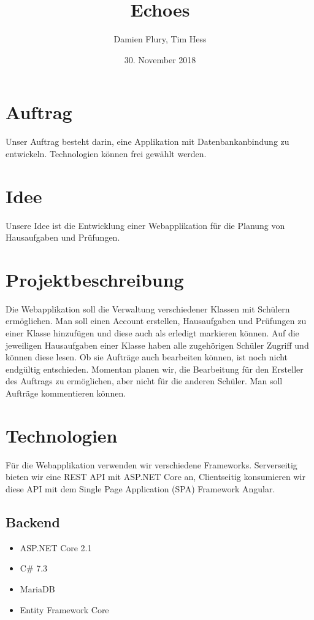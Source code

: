 \documentclass[a4paper, titlepage]{article}
\title{Echoes}
\author{Damien Flury, Tim Hess}
\date{30. November 2018}
\begin{document}
    \maketitle
    \tableofcontents
    \newpage
    
    \section{Auftrag}
    Unser Auftrag besteht darin, eine Applikation mit Datenbankanbindung zu entwickeln. Technologien
    können frei gewählt werden.
    \section{Idee}
    Unsere Idee ist die Entwicklung einer Webapplikation für die Planung von Hausaufgaben
    und Prüfungen. 
    \section{Projektbeschreibung}
    Die Webapplikation soll die Verwaltung verschiedener Klassen mit Schülern ermöglichen.
    Man soll einen Account erstellen, Hausaufgaben und Prüfungen zu einer Klasse hinzufügen
    und diese auch als erledigt markieren können. Auf die jeweiligen Hausaufgaben einer Klasse
    haben alle zugehörigen Schüler Zugriff und können diese lesen. Ob sie Aufträge auch bearbeiten
    können, ist noch nicht endgültig entschieden. Momentan planen wir, die Bearbeitung für den Ersteller
    des Auftrags zu ermöglichen, aber nicht für die anderen Schüler. Man soll Aufträge kommentieren
    können.
    \section{Technologien}
    Für die Webapplikation verwenden wir verschiedene Frameworks. Serverseitig bieten wir
    eine REST API mit ASP.NET Core an, Clientseitig konsumieren wir diese API mit dem Single
    Page Application (SPA) Framework Angular.
    \subsection{Backend}
    \begin{itemize}
        \item ASP.NET Core 2.1
        \item C\# 7.3
        \item MariaDB
        \item Entity Framework Core
    \end{itemize}
\end{document}

